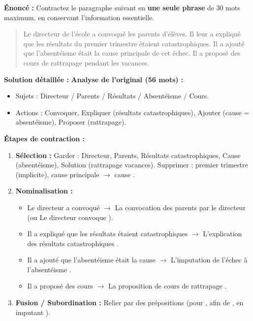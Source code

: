 \documentclass[11pt]{article}
\begin{document}
\begin{exoresolu}
\textbf{Énoncé :} Contractez le paragraphe suivant en \textbf{une seule phrase} de 30 mots maximum, en conservant l'information essentielle.
\begin{quote}
\og Le directeur de l'école a convoqué les parents d'élèves. Il leur a expliqué que les résultats du premier trimestre étaient catastrophiques. Il a ajouté que l'absentéisme était la cause principale de cet échec. Il a proposé des cours de rattrapage pendant les vacances. \fg
\end{quote}
\tcblower
\textbf{Solution détaillée :}
\textbf{Analyse de l'original (56 mots) :}
\begin{itemize}
    \item Sujets : Directeur / Parents / Résultats / Absentéisme / Cours.
    \item Actions : Convoquer, Expliquer (résultats catastrophiques), Ajouter (cause = absentéisme), Proposer (rattrapage).
\end{itemize}
\textbf{Étapes de contraction :}
\begin{enumerate}
    \item \textbf{Sélection :} Garder : Directeur, Parents, Résultats catastrophiques, Cause (absentéisme), Solution (rattrapage vacances). Supprimer : \og premier trimestre \fg{} (implicite), \og cause principale \fg{} $\rightarrow$ \og cause \fg{}.
    \item \textbf{Nominalisation :} 
    \begin{itemize}
        \item \og Le directeur a convoqué \fg{} $\rightarrow$ \og La convocation des parents par le directeur \fg{} (ou \og Le directeur convoque \fg{}).
        \item \og Il a expliqué que les résultats étaient catastrophiques \fg{} $\rightarrow$ \og L'explication des résultats catastrophiques \fg{}.
        \item \og Il a ajouté que l'absentéisme était la cause \fg{} $\rightarrow$ \og L'imputation de l'échec à l'absentéisme \fg{}.
        \item \og Il a proposé des cours \fg{} $\rightarrow$ \og La proposition de cours de rattrapage \fg{}.
    \end{itemize}
    \item \textbf{Fusion / Subordination :} Relier par des prépositions (\og pour \fg{}, \og afin de \fg{}, \og en imputant \fg{}).
\end{enumerate}

\end{exoresolu}
\end{document}
